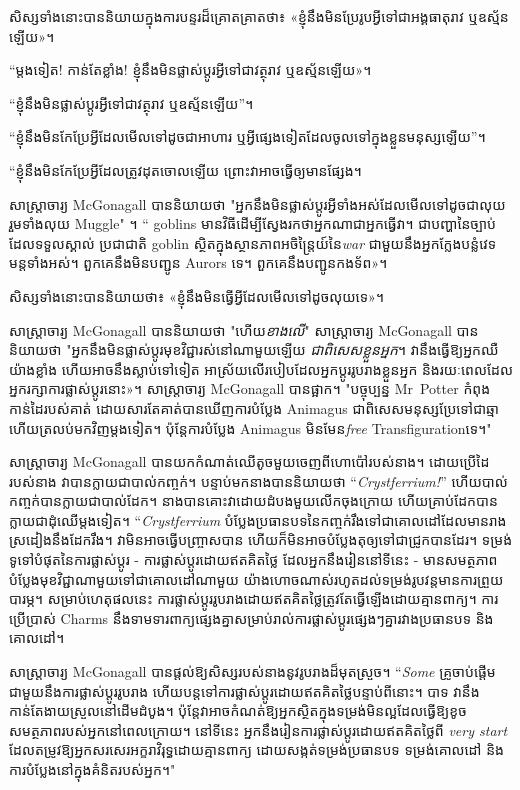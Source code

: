 {សិស្ស​ទាំង​នោះ​បាន​និយាយ​ក្នុង​ការ​បន្ទរ​ដ៏​គ្រោតគ្រាត​ថា៖ «ខ្ញុំ​នឹង​មិន​ប្រែ​រូប​អ្វី​ទៅ​ជា​អង្គធាតុ​រាវ ឬ​ឧស្ម័ន​ឡើយ»។

“ម្តងទៀត! កាន់តែខ្លាំង! ខ្ញុំនឹងមិនផ្លាស់ប្តូរអ្វីទៅជាវត្ថុរាវ ឬឧស្ម័នឡើយ»។

“ខ្ញុំនឹងមិនផ្លាស់ប្តូរអ្វីទៅជាវត្ថុរាវ ឬឧស្ម័នឡើយ”។

“ខ្ញុំ​នឹង​មិន​កែប្រែ​អ្វី​ដែល​មើល​ទៅ​ដូច​ជា​អាហារ ឬ​អ្វី​ផ្សេង​ទៀត​ដែល​ចូល​ទៅ​ក្នុង​ខ្លួន​មនុស្ស​ឡើយ”។

“ខ្ញុំ​នឹង​មិន​កែ​ប្រែ​អ្វី​ដែល​ត្រូវ​ដុត​ចោល​ឡើយ ព្រោះ​វា​អាច​ធ្វើ​ឲ្យ​មាន​ផ្សែង។

សាស្រ្តាចារ្យ McGonagall បាននិយាយថា "អ្នកនឹងមិនផ្លាស់ប្តូរអ្វីទាំងអស់ដែលមើលទៅដូចជាលុយ រួមទាំងលុយ Muggle" ។ “ goblins មានវិធីដើម្បីស្វែងរកថាអ្នកណាជាអ្នកធ្វើវា។ ជាបញ្ហានៃច្បាប់ដែលទទួលស្គាល់ ប្រជាជាតិ goblin ស្ថិតក្នុងស្ថានភាពអចិន្ត្រៃយ៍នៃ\emph{war} ជាមួយនឹងអ្នកក្លែងបន្លំវេទមន្តទាំងអស់។ ពួកគេនឹងមិនបញ្ជូន Aurors ទេ។ ពួក​គេ​នឹង​បញ្ជូន​កង​ទ័ព»។

សិស្ស​ទាំង​នោះ​បាន​និយាយ​ថា​៖ «​ខ្ញុំ​នឹង​មិន​ធ្វើ​អ្វី​ដែល​មើល​ទៅ​ដូច​លុយ​ទេ​»។

សាស្រ្តាចារ្យ McGonagall បាននិយាយថា "ហើយ\emph{{ខាងលើ}}" សាស្រ្តាចារ្យ McGonagall បាននិយាយថា "អ្នកនឹងមិនផ្លាស់ប្តូរមុខវិជ្ជារស់នៅណាមួយឡើយ \emph{ជាពិសេសខ្លួនអ្នក}។ វា​នឹង​ធ្វើ​ឱ្យ​អ្នក​ឈឺ​យ៉ាង​ខ្លាំង ហើយ​អាច​នឹង​ស្លាប់​ទៅ​ទៀត អាស្រ័យ​លើ​របៀប​ដែល​អ្នក​ប្តូរ​រូប​រាង​ខ្លួន​អ្នក និង​រយៈពេល​ដែល​អ្នក​រក្សា​ការ​ផ្លាស់​ប្តូរ​នោះ​»​។ សាស្រ្តាចារ្យ McGonagall បានផ្អាក។ "បច្ចុប្បន្ន Mr~Potter កំពុងកាន់ដៃរបស់គាត់ ដោយសារតែគាត់បានឃើញការបំប្លែង Animagus ជាពិសេសមនុស្សប្រែទៅជាឆ្មា ហើយត្រលប់មកវិញម្តងទៀត។ ប៉ុន្តែការបំប្លែង Animagus មិនមែន\emph{free} Transfigurationទេ។"

សាស្ត្រាចារ្យ McGonagall បានយកកំណាត់ឈើតូចមួយចេញពីហោប៉ៅរបស់នាង។ ដោយប្រើដៃរបស់នាង វាបានក្លាយជាបាល់កញ្ចក់។ បន្ទាប់មកនាងបាននិយាយថា “\emph{Crystferrium!}” ហើយបាល់កញ្ចក់បានក្លាយជាបាល់ដែក។ នាង​បាន​គោះ​វា​ដោយ​ដំបង​មួយ​លើក​ចុង​ក្រោយ ហើយ​គ្រាប់​ដែក​បាន​ក្លាយ​ជា​ដុំ​ឈើ​ម្តង​ទៀត។ “\emph{Crystferrium} បំប្លែងប្រធានបទនៃកញ្ចក់រឹងទៅជាគោលដៅដែលមានរាងស្រដៀងនឹងដែករឹង។ វា​មិន​អាច​ធ្វើ​បញ្ច្រាស​បាន ហើយ​ក៏​មិន​អាច​បំប្លែង​តុ​ឲ្យ​ទៅ​ជា​ជ្រូក​បាន​ដែរ។ ទម្រង់ទូទៅបំផុតនៃការផ្លាស់ប្តូរ - ការផ្លាស់ប្តូរដោយឥតគិតថ្លៃ ដែលអ្នកនឹងរៀននៅទីនេះ - មានសមត្ថភាពបំប្លែងមុខវិជ្ជាណាមួយទៅជាគោលដៅណាមួយ យ៉ាងហោចណាស់រហូតដល់ទម្រង់រូបវន្តមានការព្រួយបារម្ភ។ សម្រាប់ហេតុផលនេះ ការផ្លាស់ប្តូររូបរាងដោយឥតគិតថ្លៃត្រូវតែធ្វើឡើងដោយគ្មានពាក្យ។ ការប្រើប្រាស់ Charms នឹងទាមទារពាក្យផ្សេងគ្នាសម្រាប់រាល់ការផ្លាស់ប្តូរផ្សេងៗគ្នារវាងប្រធានបទ និងគោលដៅ។

សាស្រ្តាចារ្យ McGonagall បានផ្តល់ឱ្យសិស្សរបស់នាងនូវរូបរាងដ៏មុតស្រួច។ “\emph{Some} គ្រូចាប់ផ្តើមជាមួយនឹងការផ្លាស់ប្តូររូបរាង ហើយបន្តទៅការផ្លាស់ប្តូរដោយឥតគិតថ្លៃបន្ទាប់ពីនោះ។ បាទ វានឹងកាន់តែងាយស្រួលនៅដើមដំបូង។ ប៉ុន្តែ​វា​អាច​កំណត់​ឱ្យ​អ្នក​ស្ថិត​ក្នុង​ទម្រង់​មិនល្អ​ដែល​ធ្វើឱ្យ​ខូច​សមត្ថភាព​របស់​អ្នក​នៅពេល​ក្រោយ។ នៅទីនេះ អ្នកនឹងរៀនការផ្លាស់ប្តូរដោយឥតគិតថ្លៃពី \emph{very start} ដែលតម្រូវឱ្យអ្នកសរសេរអក្ខរាវិរុទ្ធដោយគ្មានពាក្យ ដោយសង្កត់ទម្រង់ប្រធានបទ ទម្រង់គោលដៅ និងការបំប្លែងនៅក្នុងគំនិតរបស់អ្នក។"

}
